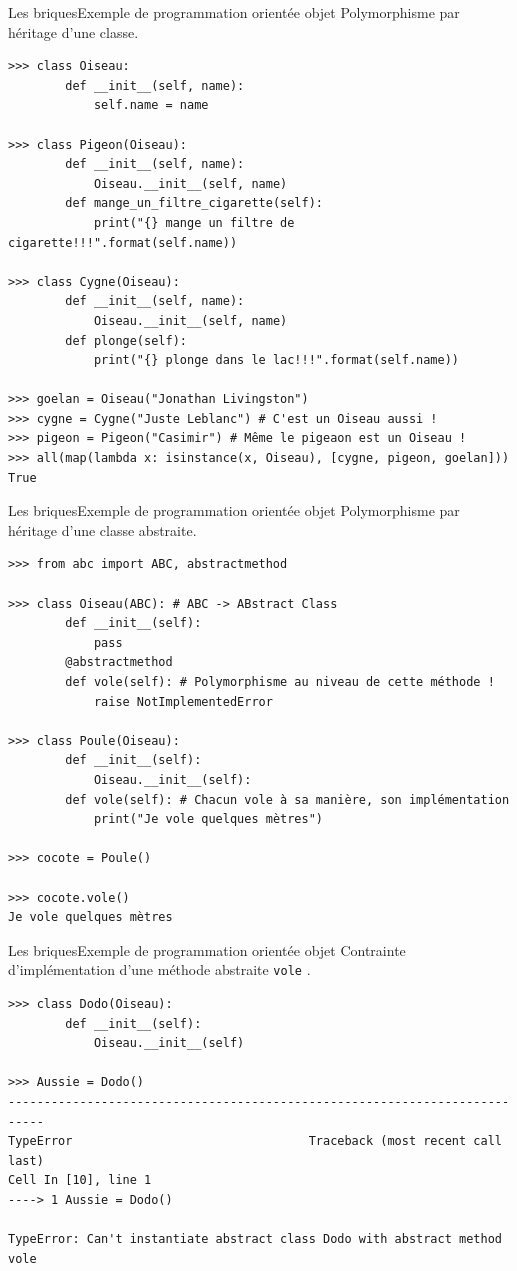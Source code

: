 \documentclass{beamer}
\begin{document}
    \begin{frame}[fragile]{Les briques}{Exemple de programmation orientée objet}
        Polymorphisme par héritage d'une classe.
        \begin{lstlisting}
>>> class Oiseau:
        def __init__(self, name):
            self.name = name

>>> class Pigeon(Oiseau):
        def __init__(self, name):
            Oiseau.__init__(self, name)
        def mange_un_filtre_cigarette(self):
            print("{} mange un filtre de cigarette!!!".format(self.name))

>>> class Cygne(Oiseau):
        def __init__(self, name):
            Oiseau.__init__(self, name)
        def plonge(self):
            print("{} plonge dans le lac!!!".format(self.name))

>>> goelan = Oiseau("Jonathan Livingston")
>>> cygne = Cygne("Juste Leblanc") # C'est un Oiseau aussi !
>>> pigeon = Pigeon("Casimir") # Même le pigeaon est un Oiseau !
>>> all(map(lambda x: isinstance(x, Oiseau), [cygne, pigeon, goelan]))
True
        \end{lstlisting}
    \end{frame}

    \begin{frame}[fragile]{Les briques}{Exemple de programmation orientée objet}
        Polymorphisme par héritage d'une classe abstraite.
        \begin{lstlisting}
>>> from abc import ABC, abstractmethod

>>> class Oiseau(ABC): # ABC -> ABstract Class
        def __init__(self):
            pass
        @abstractmethod
        def vole(self): # Polymorphisme au niveau de cette méthode !
            raise NotImplementedError

>>> class Poule(Oiseau):
        def __init__(self):
            Oiseau.__init__(self):
        def vole(self): # Chacun vole à sa manière, son implémentation
            print("Je vole quelques mètres")

>>> cocote = Poule()

>>> cocote.vole()
Je vole quelques mètres
        \end{lstlisting}
    \end{frame}

    \begin{frame}[fragile]{Les briques}{Exemple de programmation orientée objet}
        Contrainte d'implémentation d'une méthode abstraite \lstinline{vole} .

        \begin{lstlisting}
>>> class Dodo(Oiseau):
        def __init__(self):
            Oiseau.__init__(self)

>>> Aussie = Dodo()
---------------------------------------------------------------------------
TypeError                                 Traceback (most recent call last)
Cell In [10], line 1
----> 1 Aussie = Dodo()

TypeError: Can't instantiate abstract class Dodo with abstract method vole
        \end{lstlisting}
    \end{frame}
\end{document}
